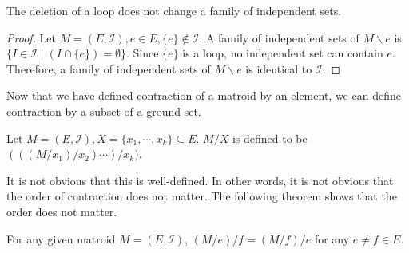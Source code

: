 \begin{thm}
The deletion of a loop does not change a family of independent sets.
\end{thm}

\begin{proof}
Let $M = (E, \mathcal{I}), e \in E, \{ e \} \notin \mathcal{I}$.
A family of independent sets of $M \backslash e$ is $\{ I \in \mathcal{I} \mid (I \cap \{ e \}) = \emptyset \}$.
Since $\{ e \}$ is a loop, no independent set can contain $e$.
Therefore, a family of independent sets of $M \backslash e$ is identical to $\mathcal{I}$.
\end{proof}

Now that we have defined contraction of a matroid by an element, we can define contraction by a subset of a ground set.
\begin{defn}
Let $M = (E, \mathcal{I}), X = \{ x_1, \cdots, x_k \} \subseteq E$.
$M / X$ is defined to be $(((M/x_1)/x_2) \cdots)/x_k)$.
\end{defn}

It is not obvious that this is well-defined. 
In other words, it is not obvious that the order of contraction does not matter.
The following theorem shows that the order does not matter.

\begin{thm}
For any given matroid $M = (E, \mathcal{I})$,
$(M / e) / f = (M / f) / e$ for any $e \neq f \in E$.
\end{thm}

